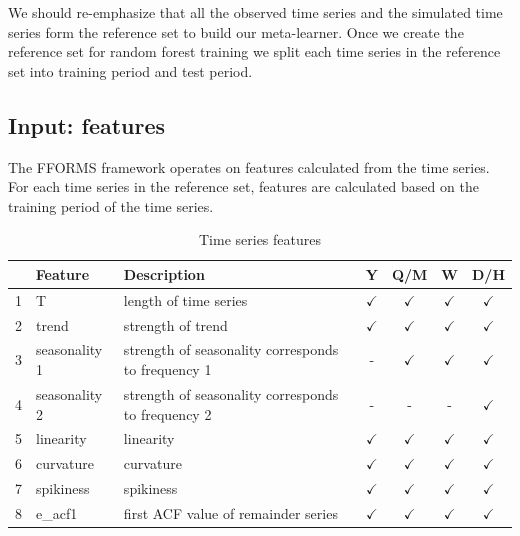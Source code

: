 \documentclass[11pt,a4paper,]{article}
\def\yes{$\checkmark$}
\begin{document}
We should re-emphasize that all the observed time series and the
simulated time series form the reference set to build our meta-learner.
Once we create the reference set for random forest training we split
each time series in the reference set into training period and test
period.

\subsection{Input: features}\label{input-features}

The FFORMS framework operates on features calculated from the time
series. For each time series in the reference set, features are
calculated based on the training period of the time series.

\begin{table}[!htp]
\centering\footnotesize\tabcolsep=0.12cm
\caption{Time series features}
\label{feature}
\begin{tabular}{llp{}cccc}
\toprule
\multicolumn{2}{c}{Feature} & Description & Y & Q/M & W & D/H\\
\midrule
1  & T              & length of time series                                                                   & \yes  & \yes & \yes & \yes\\
2  & trend          & strength of trend                                                                       & \yes  & \yes & \yes & \yes\\
3  & seasonality 1    & strength of seasonality corresponds to frequency 1                                                              & -     & \yes & \yes & \yes\\
4  & seasonality 2    & strength of seasonality corresponds to frequency 2                                                              & -     & - & -& \yes\\
5  & linearity      & linearity                                                                               & \yes  & \yes & \yes & \yes\\
6  & curvature      & curvature                                                                               & \yes  & \yes & \yes & \yes\\
7  & spikiness      & spikiness                                                                               & \yes  & \yes & \yes & \yes\\
8  & e\_acf1        & first ACF value of remainder series                                                     & \yes  & \yes & \yes & \yes\\

\end{tabular}
\end{table}
\end{document}
